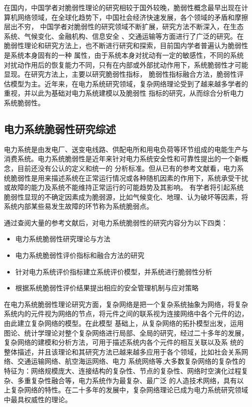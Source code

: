 在国内，中国学者对脆弱性理论的研究相较于国外较晚，脆弱性概念最早出现在计算机网络领域\cite{refs17}，在全球化趋势下，中国社会经济快速发展，各个领域的矛盾和摩擦层出不穷，
中国学者对脆弱性的研究领域不断扩展，研究方法不断深入，在生态系统\cite{refs18,refs19}、气候变化\cite{refs20,refs21}、金融机构\cite{refs22,refs23,refs24}、信息安全
\cite{refs25,refs26}、交通运输\cite{refs27,refs28}等方面进行了广泛的研究。在脆弱性理论和研究方法上，也不断进行研究和探索，目前国内学者普遍认为脆弱性是系统本身固有的一种
属性，由于系统本身对扰动有一定的敏感性，不同的系统对扰动作用后的恢复能力不同，只有在内部或外部扰动作用下，系统脆弱性才可能显现。在研究方法上，主要以研究脆弱性指标\cite{refs29}，
脆弱性指标融合方法\cite{refs30}，脆弱性评估模型为主。近年来，在电力系统研究领域，复杂网络理论\cite{refs31}受到了越来越多学者的重视，并以此为基础对电力系统建模以及脆弱性
指标的研究，从而综合分析电力系统脆弱性。


\subsection{电力系统脆弱性研究综述}
\label{sec:presentPowerSys}
电力系统是由发电厂、送变电线路、供配电所和用电负荷等环节组成的电能生产与消费系统。电力系统脆弱性是近年来针对电力系统安全性和可靠性提出的一个新概念，目前还没有公认的定义和统一的
分析标准。但从已有的参考文献看，电力系统脆弱性是用来描述系统在正常运行情况或各种随机因素的作用下，系统承受干扰或故障的能力及系统不能维持正常运行的可能趋势及其影响\cite{refs32}。
有学者将引起系统脆弱性显现的不确定因素成为脆弱源，比如气候变化、地理、认为破坏等因素，将系统内部某些易发生故障的环节称为系统脆弱点。

通过查阅大量的参考文献后，对电力系统脆弱性的研究内容分为以下四类：
\begin{itemize}
  \item 电力系统脆弱性研究理论与方法
  \item 电力系统脆弱性评价指标和融合方法的研究
  \item 针对电力系统评价指标建立系统评价模型，并系统进行脆弱性分析
  \item 根据系统脆弱性评价结果提出相应的安全管理机制与应对策略 
\end{itemize}

在电力系统脆弱性理论研究方面，复杂网络是把一个复杂系统抽象为网络，将复杂系统内的元件视为网络的节点，将元件之间的联系视为连接网络中各个元件的边，由此建立复杂网络的模型。在此模型
基础上，从复杂网络的拓扑模型出发，运用图论、统计学理论对整个复杂网络进行局部、全局的研究，经过二十多年的发展，复杂网络的建模和分析方法，可用于描述系统内各个元件的相互关联以及系
统的整体描述，并且该理论和其研究方法已越来越多应用于各个领域，比如社会关系网络\cite{refs33}、交通运输网络\cite{refs34,refs35,refs36}、航空海运网络\cite{refs38,refs39}、电力
系统网络\cite{refs40,refs41}等,大多数复杂网络的复杂性的特征为：网络规模庞大、连接结构的复杂性、节点的复杂性、网络时空演化过程复杂、多重复杂性融合等，电力系统作为最复杂、最广泛
的人造技术网络，具有以上复杂网络的特性。在二十多年的发展中，复杂网络理论已成为电力系统研究领域中最具权威性的理论。

